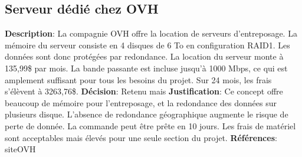

\subsection{Serveur dédié chez OVH}
\label{s:archiver_conc4}

\textbf{Description}: La compagnie OVH offre la location de serveurs d’entreposage. La mémoire du serveur consiste en 4 disques de 6 To en configuration RAID1. Les données sont donc protégées par redondance. La location du serveur monte à 135,99\$ par mois. La bande passante est incluse jusqu’à 1000 Mbps, ce qui est amplement suffisant pour tous les besoins du projet. Sur 24 mois, les frais s’élèvent à 3263,76\$. 
\textbf{Décision}: Retenu mais
\textbf{Justification}: Ce concept offre beaucoup de mémoire pour l’entreposage, et la redondance des données sur plusieurs disque. L’absence de redondance géographique augmente le risque de perte de donnée. La commande peut être prête en 10 jours. Les frais de matériel sont acceptables mais élevés pour une seule section du projet.
\textbf{Références}: siteOVH

